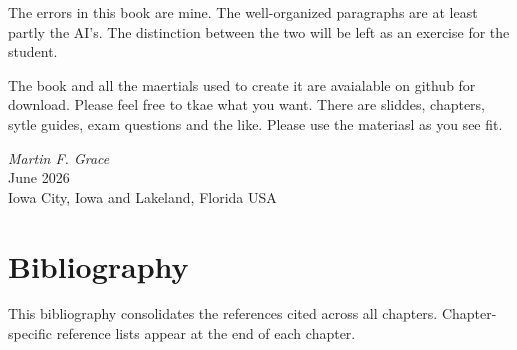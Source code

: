 \documentclass[11pt,openany]{book}
\begin{document}
The errors in this book are mine. The well-organized paragraphs are at least partly the AI's. The distinction between the two will be left as an exercise for the student.

The book and all the maertials used to create it are avaialable on github for download. Please feel free to tkae what you want. There are sliddes, chapters, sytle guides, exam questions and the like. Please use the materiasl as you see fit. 



\vspace{2\baselineskip}

\begin{flushright}
\textit{Martin F. Grace}\\
June 2026 \\
Iowa City, Iowa and Lakeland, Florida USA
\end{flushright}

\singlespacing
\clearpage

\tableofcontents

\mainmatter











\backmatter

\chapter*{Bibliography}
{}

\noindent This bibliography consolidates the references cited across all
chapters. Chapter-specific reference lists appear at the end of each
chapter.

\medskip
\begingroup
\sloppy\small

\endgroup

\printindex
\end{document}
